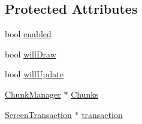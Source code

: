 \subsection*{Protected Attributes}
\begin{DoxyCompactItemize}
\item 
bool \hyperlink{class_layer_af9f9c9a8c4a053bd829a06273df297bd}{enabled}
\item 
bool \hyperlink{class_layer_a64902a81921ba2fc792d044392b14ecc}{will\-Draw}
\item 
bool \hyperlink{class_layer_a8c3badeb437135a265c931f4ee728a48}{will\-Update}
\item 
\hyperlink{class_chunk_manager}{Chunk\-Manager} $\ast$ \hyperlink{class_layer_ab5408f6d27ad51d73df507296f16c811}{Chunks}
\item 
\hyperlink{class_screen_transaction}{Screen\-Transaction} $\ast$ \hyperlink{class_layer_a3f0f6e109409d047c650380b6715c316}{transaction}
\end{DoxyCompactItemize}


